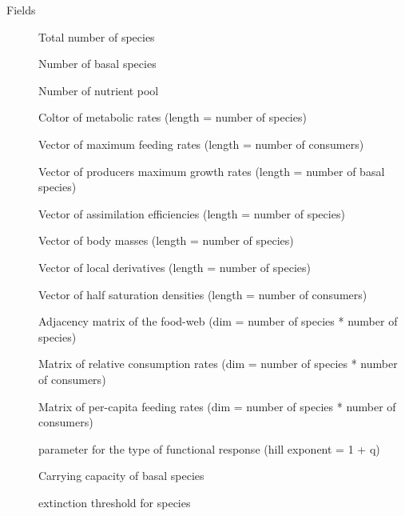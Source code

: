 \documentclass[letterpaper]{book}
\begin{document}
\begin{Section}{Fields}

\begin{description}

\item[] Total number of species

\item[] Number of basal species

\item[] Number of nutrient pool

\item[] Coltor of metabolic rates (length = number of species)

\item[] Vector of maximum feeding rates (length = number of consumers)

\item[] Vector of producers maximum growth rates (length = number of basal species)

\item[] Vector of assimilation efficiencies (length = number of species)

\item[] Vector of body masses (length = number of species)

\item[] Vector of local derivatives (length = number of species)

\item[] Vector of half saturation densities (length = number of consumers)

\item[] Adjacency matrix of the food-web (dim = number of species * number of species)

\item[] Matrix of relative consumption rates (dim = number of species * number of consumers)

\item[] Matrix of per-capita feeding rates (dim = number of species * number of consumers)

\item[] parameter for the type of functional response (hill exponent = 1 + q)

\item[] Carrying capacity of basal species

\item[] extinction threshold for species


\end{description}
\end{Section}
\end{document}
